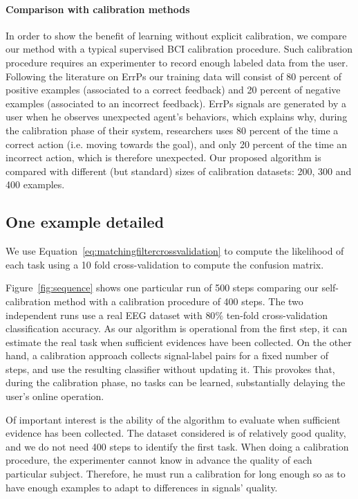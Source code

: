 
\paragraph{Comparison with calibration methods} In order to show the benefit of learning without explicit calibration, we compare our method with a typical supervised BCI calibration procedure. Such calibration procedure requires an experimenter to record enough labeled data from the user. Following the literature on ErrPs \cite{chavarriaga2010learning,iturrate2013task} our training data will consist of 80 percent of positive examples (associated to a correct feedback) and 20 percent of negative examples (associated to an incorrect feedback). ErrPs signals are generated by a user when he observes unexpected agent's behaviors, which explains why, during the calibration phase of their system, researchers uses 80 percent of the time a correct action (i.e. moving towards the goal), and only 20 percent of the time an incorrect action, which is therefore unexpected. Our proposed algorithm is compared with different (but standard) sizes of calibration datasets: 200, 300 and 400 examples.

\subsection{One example detailed}

We use Equation~\ref{eq:matchingfiltercrossvalidation} to compute the likelihood of each task using a 10 fold cross-validation to compute the confusion matrix.

Figure~\ref{fig:sequence} shows one particular run of 500 steps comparing our self-calibration method with a calibration procedure of 400 steps. The two independent runs use a real EEG dataset with $80\%$ ten-fold cross-validation classification accuracy. As our algorithm is operational from the first step, it can estimate the real task when sufficient evidences have been collected. On the other hand, a calibration approach collects signal-label pairs for a fixed number of steps, and use the resulting classifier without updating it. This provokes that, during the calibration phase, no tasks can be learned, substantially delaying the user's online operation. 

Of important interest is the ability of the algorithm to evaluate when sufficient evidence has been collected. The dataset considered is of relatively good quality, and we do not need 400 steps to identify the first task. When doing a calibration procedure, the experimenter cannot know in advance the quality of each particular subject. Therefore, he must run a calibration for long enough so as to have enough examples to adapt to differences in signals' quality. 

